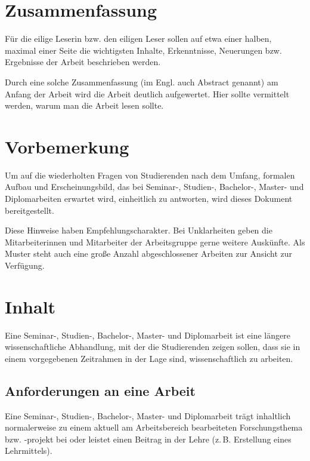 \documentclass[
    fontsize=12pt,
    headings=small,
    parskip=half,           %
    bibliography=totoc,
    numbers=noenddot,       %
    open=any,               %
    ]{scrreprt}
\begin{document}
\chapter*{Zusammenfassung}

Für die eilige Leserin bzw. den eiligen Leser sollen auf etwa einer halben, maximal einer Seite die wichtigsten Inhalte, Erkenntnisse, Neuerungen bzw. Ergebnisse der Arbeit beschrieben werden.

Durch eine solche Zusammenfassung (im Engl. auch Abstract genannt) am Anfang der Arbeit wird die Arbeit deutlich aufgewertet. Hier sollte vermittelt werden, warum man die Arbeit lesen sollte.

\tableofcontents

\chapter{Vorbemerkung}

Um auf die wiederholten Fragen von Studierenden nach dem Umfang, formalen Aufbau und Erscheinungsbild, das bei Seminar-, Studien-, Bachelor-, Master- und Diplomarbeiten erwartet wird, einheitlich zu antworten, wird dieses Dokument bereitgestellt.

Diese Hinweise haben Empfehlungscharakter. Bei Unklarheiten geben die Mitarbeiterinnen und Mitarbeiter der Arbeitsgruppe gerne weitere Auskünfte. Als Muster steht auch eine große Anzahl abgeschlossener Arbeiten zur Ansicht zur Verfügung.

\chapter{Inhalt}
\label{sec.inhalt}

Eine Seminar-, Studien-, Bachelor-, Master- und Diplomarbeit ist eine längere wissenschaftliche Abhandlung, mit der die Studierenden zeigen sollen, dass sie in einem vorgegebenen Zeitrahmen in der Lage sind, wissenschaftlich zu arbeiten.

\section{Anforderungen an eine Arbeit}
\label{sec.anforderungen}

Eine Seminar-, Studien-, Bachelor-, Master- und Diplomarbeit trägt inhaltlich normalerweise zu einem aktuell am Arbeitsbereich bearbeiteten Forschungsthema bzw. -projekt bei oder leistet einen Beitrag in der Lehre (z.\,B. Erstellung eines Lehrmittels).
\end{document}
